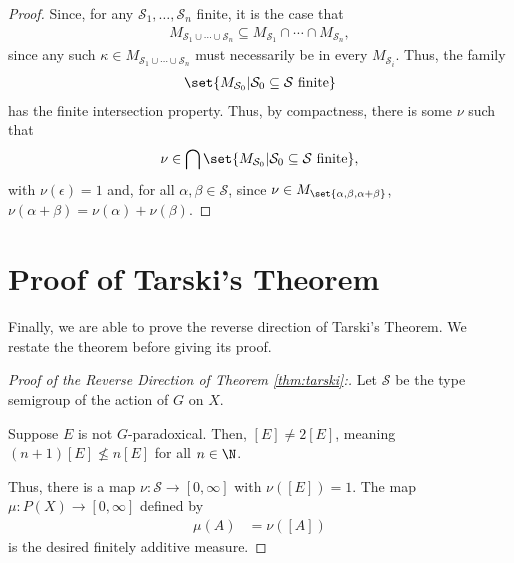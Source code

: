 \begin{proof}
  Since, for any $\mathcal{S}_1,\dots,\mathcal{S}_n$ finite, it is the case that
  \begin{align*}
    M_{\mathcal{S}_1\cup\cdots\cup \mathcal{S}_n} \subseteq M_{\mathcal{S}_1} \cap \cdots \cap M_{\mathcal{S}_n},
  \end{align*}
  since any such $\kappa\in M_{\mathcal{S}_1\cup\cdots\cup \mathcal{S}_n}$ must necessarily be in every $M_{\mathcal{S}_i}$. Thus, the family
  \begin{align*}
    \set{M_{\mathcal{S}_0}| \mathcal{S}_0\subseteq \mathcal{S}\text{ finite}}
  \end{align*}
  has the finite intersection property. Thus, by compactness, there is some $\nu$ such that
  \begin{align*}
    \nu\in \bigcap\set{M_{\mathcal{S}_0}| \mathcal{S}_0\subseteq \mathcal{S}\text{ finite}},
  \end{align*}
  with $\nu\left(\epsilon\right) = 1$ and, for all $\alpha,\beta\in \mathcal{S}$, since $\nu\in M_{\set{\alpha,\beta,\alpha + \beta}}$, $\nu\left(\alpha + \beta\right) = \nu\left(\alpha\right) + \nu\left(\beta\right)$.
\end{proof}
\section{Proof of Tarski's Theorem}%
Finally, we are able to prove the reverse direction of Tarski's Theorem. We restate the theorem before giving its proof.
\tarski*
\begin{proof}[Proof of the Reverse Direction of Theorem \ref{thm:tarski}:]
  Let $\mathcal{S}$ be the type semigroup of the action of $G$ on $X$.\newline

  Suppose $E$ is not $G$-paradoxical. Then, $\left[E\right]\neq 2\left[E\right]$, meaning $\left(n+1\right)\left[E\right]\nleq n\left[E\right]$ for all $n\in \N$.\newline

  Thus, there is a map $\nu\colon \mathcal{S}\rightarrow [0,\infty]$ with $\nu\left(\left[E\right]\right) = 1$. The map $\mu\colon P(X)\rightarrow [0,\infty]$ defined by
  \begin{align*}
    \mu\left(A\right) &= \nu\left(\left[A\right]\right)
  \end{align*}
  is the desired finitely additive measure.
\end{proof}


